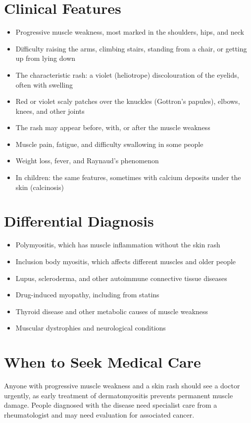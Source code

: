 \section*{Clinical Features}
\begin{itemize}
    \item Progressive muscle weakness, most marked in the shoulders, hips, and neck
    \item Difficulty raising the arms, climbing stairs, standing from a chair, or getting up from lying down
    \item The characteristic rash: a violet (heliotrope) discolouration of the eyelids, often with swelling
    \item Red or violet scaly patches over the knuckles (Gottron's papules), elbows, knees, and other joints
    \item The rash may appear before, with, or after the muscle weakness
    \item Muscle pain, fatigue, and difficulty swallowing in some people
    \item Weight loss, fever, and Raynaud's phenomenon
    \item In children: the same features, sometimes with calcium deposits under the skin (calcinosis)
\end{itemize}

\section*{Differential Diagnosis}
\begin{itemize}
    \item Polymyositis, which has muscle inflammation without the skin rash
    \item Inclusion body myositis, which affects different muscles and older people
    \item Lupus, scleroderma, and other autoimmune connective tissue diseases
    \item Drug-induced myopathy, including from statins
    \item Thyroid disease and other metabolic causes of muscle weakness
    \item Muscular dystrophies and neurological conditions
\end{itemize}

\section*{When to Seek Medical Care}
Anyone with progressive muscle weakness and a skin rash should see a doctor urgently, as early treatment of dermatomyositis prevents permanent muscle damage. People diagnosed with the disease need specialist care from a rheumatologist and may need evaluation for associated cancer.

